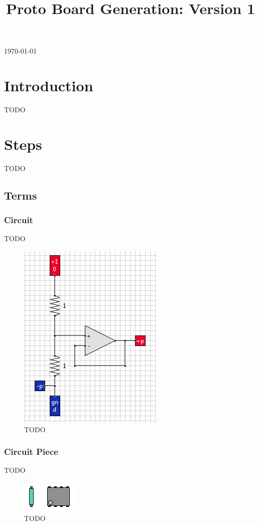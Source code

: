 \documentclass[12pt]{amsart}
\title{Proto Board Generation: Version 1}
\begin{document}
\today
\maketitle

\section{Introduction}

TODO

\section{Steps}

TODO

\subsection{Terms}

\subsubsection{Circuit}

TODO

\begin{figure}
\includegraphics{Images/Circuit.png}
\caption{TODO}
\label{fig:circuit}
\end{figure}

\subsubsection{Circuit Piece}

TODO

\begin{figure}
\includegraphics{Images/Circuit_Pieces.png}
\caption{TODO}
\label{fig:pieces}
\end{figure}
\end{document}
